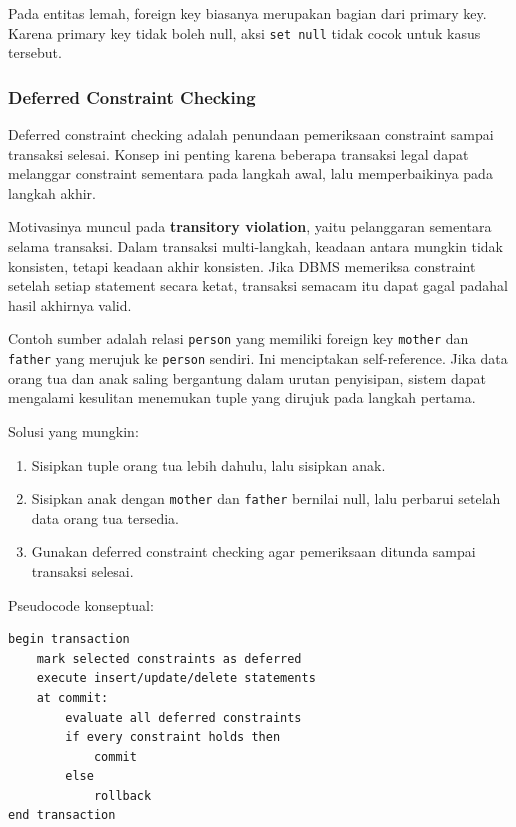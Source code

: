 Pada entitas lemah, foreign key biasanya merupakan bagian dari primary key. Karena primary key tidak boleh null, aksi \texttt{set null} tidak cocok untuk kasus tersebut.

\subsubsection{Deferred Constraint Checking}

\begin{jawab}
Deferred constraint checking adalah penundaan pemeriksaan constraint sampai transaksi selesai. Konsep ini penting karena beberapa transaksi legal dapat melanggar constraint sementara pada langkah awal, lalu memperbaikinya pada langkah akhir.
\end{jawab}

Motivasinya muncul pada \textbf{transitory violation}, yaitu pelanggaran sementara selama transaksi. Dalam transaksi multi-langkah, keadaan antara mungkin tidak konsisten, tetapi keadaan akhir konsisten. Jika DBMS memeriksa constraint setelah setiap statement secara ketat, transaksi semacam itu dapat gagal padahal hasil akhirnya valid.

Contoh sumber adalah relasi \texttt{person} yang memiliki foreign key \texttt{mother} dan \texttt{father} yang merujuk ke \texttt{person} sendiri. Ini menciptakan self-reference. Jika data orang tua dan anak saling bergantung dalam urutan penyisipan, sistem dapat mengalami kesulitan menemukan tuple yang dirujuk pada langkah pertama.

Solusi yang mungkin:
\begin{enumerate}
    \item Sisipkan tuple orang tua lebih dahulu, lalu sisipkan anak.
    \item Sisipkan anak dengan \texttt{mother} dan \texttt{father} bernilai null, lalu perbarui setelah data orang tua tersedia.
    \item Gunakan deferred constraint checking agar pemeriksaan ditunda sampai transaksi selesai.
\end{enumerate}

Pseudocode konseptual:
\begin{lstlisting}[caption={Pseudocode deferred constraint checking}, label={lst:deferred-checking}]
begin transaction
    mark selected constraints as deferred
    execute insert/update/delete statements
    at commit:
        evaluate all deferred constraints
        if every constraint holds then
            commit
        else
            rollback
end transaction
\end{lstlisting}


